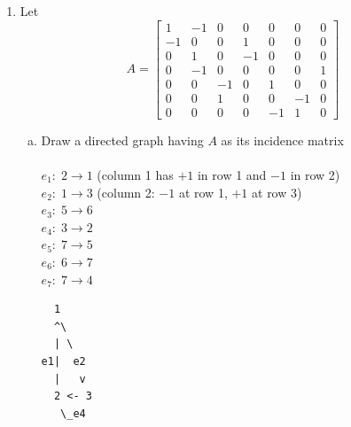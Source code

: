 \documentclass{article}
\begin{document}
{{\begin{enumerate}
\newpage\item Let 
$$A= \left[
\begin{array}{ccccccc}
1 & -1 & 0 & 0 & 0 & 0 & 0\\
-1 & 0 & 0 & 1 & 0 &  0 & 0\\
0 & 1 & 0 & -1 & 0 &  0 & 0\\
0 & -1 & 0 & 0 & 0 & 0  & 1 \\
0  & 0  & -1  & 0  & 1  & 0  & 0 \\
0  & 0  & 1  & 0  &  0 & -1  & 0\\
0 & 0 & 0 & 0 & -1 & 1 & 0
\end{array} \right] $$

\begin{enumerate}[a.]
\item Draw a directed graph having $A$ as its incidence matrix
\\
\\$e_1:\; 2 \to 1$ (column 1 has $+1$ in row 1 and $-1$ in row 2)
\\$e_2:\; 1 \to 3$ (column 2: $-1$ at row 1, $+1$ at row 3)
\\$e_3:\; 5 \to 6$
\\$e_4:\; 3 \to 2$
\\$e_5:\; 7 \to 5$
\\$e_6:\; 6 \to 7$
\\$e_7:\; 7 \to 4$
\begin{verbatim}
  1
  ^\ 
  | \
e1|  e2
  |   v
  2 <- 3
   \_e4


\end{verbatim}
\end{enumerate}
\end{enumerate}}}
\end{document}
